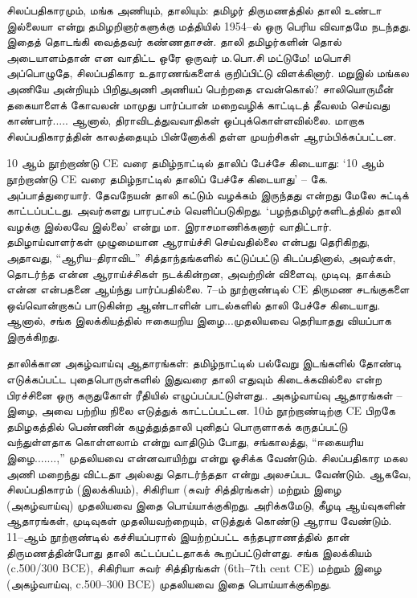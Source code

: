 { \item 
 சிலப்பதிகாரமும், மங்க அணியும், தாலியும்: தமிழர் திருமணத்தில் தாலி உண்டா இல்லையா என்று தமிழறிஞர்களுக்கு மத்தியில் 1954–ல் ஒரு பெரிய விவாதமே நடந்தது. இதைத் தொடங்கி வைத்தவர் கண்ணதாசன். தாலி தமிழர்களின் தொல் அடையாளம்தான் என வாதிட்ட ஒரே ஒருவர் ம.பொ.சி மட்டுமே! மபொசி அப்பொழுதே, சிலப்பதிகார உதாரணங்களைக் குறிப்பிட்டு விளக்கினார். 
 மறுஇல் மங்கல அணியே அன்றியும் பிறிதுஅணி அணியப் பெற்றதை எவன்கொல்? 
 சாலியொருமீன் தகையாளைக் கோவலன் மாமுது பார்ப்பான் மறைவழிக் காட்டிடத் தீவலம் செய்வது காண்பார்.....
 ஆனால், திராவிடத்துவவாதிகள் ஒப்புக்கொள்ளவில்லை. மாறாக சிலப்பதிகாரத்தின் காலத்தையும் பின்னோக்கி தள்ள முயற்சிகள் ஆரம்பிக்கப்பட்டன.

 \item 10 ஆம் நூற்றாண்டு CE வரை தமிழ்நாட்டில் தாலிப் பேச்சே கிடையாது: ‘10 ஆம் நூற்றாண்டு CE வரை தமிழ்நாட்டில் தாலிப் பேச்சே கிடையாது’ – கே. அப்பாத்துரையார். தேவநேயன் தாலி கட்டும் வழக்கம் இருந்தது என்றது மேலே சுட்டிக் காட்டப்பட்டது. அவர்களது பாரபட்சம் வெளிப்படுகிறது. ‘பழந்தமிழர்களிடத்தில் தாலி வழக்கு இல்லவே இல்லை’ என்று மா. இராசமாணிக்கனார் வாதிட்டார். தமிழாய்வாளர்கள் முழுமையான ஆராய்ச்சி செய்வதில்லை என்பது தெரிகிறது, அதாவது, “ஆரிய–திராவிட” சித்தாந்தங்களில் கட்டுப்பட்டு கிடப்பதினால், அவர்கள், தொடர்ந்த என்ன ஆராய்ச்சிகள் நடக்கின்றன, அவற்றின் விளைவு, முடிவு, தாக்கம் என்ன என்பதனை ஆய்ந்து பார்ப்பதில்லை. 7–ம் நூற்றாண்டில் CE திருமண சடங்குகளை ஒவ்வொன்றாகப் பாடுகின்ற ஆண்டாளின் பாடல்களில் தாலி பேச்சே கிடையாது. ஆனால், சங்க இலக்கியத்தில் ஈகையறிய இழை...முதலியவை தெரியாதது வியப்பாக இருக்கிறது. 

 \item தாலிக்கான அகழ்வாய்வு ஆதாரங்கள்: தமிழ்நாட்டில் பல்வேறு இடங்களில் தோண்டி எடுக்கப்பட்ட புதைபொருள்களில் இதுவரை தாலி எதுவும் கிடைக்கவில்லை என்ற பிரச்சினை ஒரு கருதுகோள் ரீதியில் எழுப்பப்பட்டுள்ளது.. அகழ்வாய்வு ஆதாரங்கள் – இழை, அவை பற்றிய நிலை எடுத்துக் காட்டப்பட்டன. 10ம் நூற்றாண்டிற்கு CE பிறகே தமிழகத்தில் பெண்ணின் கழுத்துத்தாலி புனிதப் பொருளாகக் கருதப்பட்டு வந்துள்ளதாக கொள்ளலாம் என்று வாதிடும் போது, சங்காலத்து, “ஈகையரிய இழை.......,” முதலியவை என்னவாயிற்று என்று ஓசிக்க வேண்டும். சிலப்பதிகார மகல அணி மறைந்து விட்டதா அல்லது தொடர்ந்ததா என்று அலசப்பட வேண்டும். ஆகவே, சிலப்பதிகாரம் (இலக்கியம்), சிகிரியா (சுவர் சித்திரங்கள்) மற்றும் இழை (அகழ்வாய்வு) முதலியவை இதை பொய்யாக்குகிறது. அரிக்கமேடு, கீழடி ஆய்வுகளின் ஆதாரங்கள், முடிவுகள் முதலியவற்றையும், எடுத்துக் கொண்டு ஆராய வேண்டும். 11–ஆம் நூற்றாண்டில் கச்சியப்பரால் இயற்றப்பட்ட கந்தபுராணத்தில் தான் திருமணத்தின்போது தாலி கட்டப்பட்டதாகக் கூறப்பட்டுள்ளது. சங்க இலக்கியம் (c.500/300 BCE), சிகிரியா சுவர் சித்திரங்கள் (6th–7th cent CE) மற்றும் இழை (அகழ்வாய்வு, c.500–300 BCE) முதலியவை இதை பொய்யாக்குகிறது.

}
